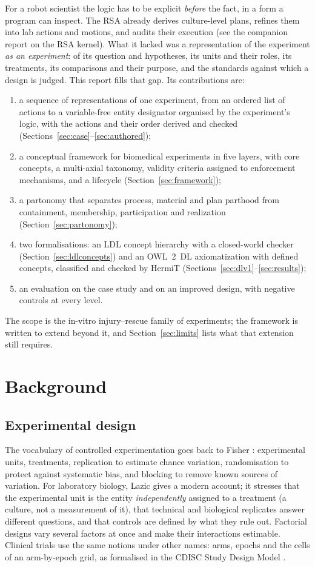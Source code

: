 \documentclass[10pt,a4paper]{article}
\begin{document}
For a robot scientist the logic has to be explicit \emph{before} the fact, in a form a program can inspect. The RSA
already derives culture-level plans, refines them into lab actions and motions, and audits their execution (see the
companion report on the RSA kernel). What it lacked was a representation of the experiment \emph{as an experiment}:
of its question and hypotheses, its units and their roles, its treatments, its comparisons and their purpose, and
the standards against which a design is judged. This report fills that gap. Its contributions are:
\begin{enumerate}
\item a sequence of representations of one experiment, from an ordered list of actions to a variable-free entity
  designator organised by the experiment's logic, with the actions and their order derived and checked
  (Sections~\ref{sec:case}--\ref{sec:authored});
\item a conceptual framework for biomedical experiments in five layers, with core concepts, a multi-axial taxonomy,
  validity criteria assigned to enforcement mechanisms, and a lifecycle (Section~\ref{sec:framework});
\item a partonomy that separates process, material and plan parthood from containment, membership, participation and
  realization (Section~\ref{sec:partonomy});
\item two formalisations: an LDL concept hierarchy with a closed-world checker (Section~\ref{sec:ldlconcepts}) and an
  OWL~2~DL axiomatization with defined concepts, classified and checked by HermiT (Sections~\ref{sec:dlv1}--\ref{sec:results});
\item an evaluation on the case study and on an improved design, with negative controls at every level.
\end{enumerate}
The scope is the in-vitro injury--rescue family of experiments; the framework is written to extend beyond it, and
Section~\ref{sec:limits} lists what that extension still requires.


\section{Background}\label{sec:background}
\subsection{Experimental design}
The vocabulary of controlled experimentation goes back to Fisher \citep{fisher1935}: experimental units, treatments,
replication to estimate chance variation, randomisation to protect against systematic bias, and blocking to remove
known sources of variation. For laboratory biology, Lazic \citep{lazic2016} gives a modern account; it stresses that
the experimental unit is the entity \emph{independently} assigned to a treatment (a culture, not a measurement of it),
that technical and biological replicates answer different questions, and that controls are defined by what they rule
out. Factorial designs vary several factors at once and make their interactions estimable. Clinical trials use the
same notions under other names: arms, epochs and the cells of an arm-by-epoch grid, as formalised in the CDISC Study
Design Model \citep{cdisc_sdm}.
\end{document}
